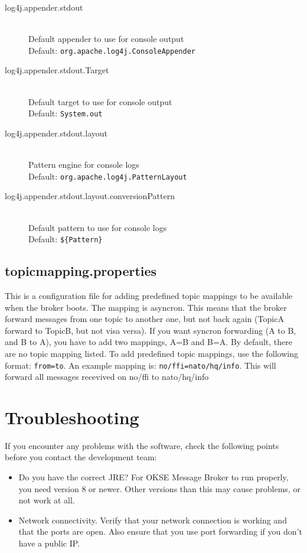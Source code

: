 \begin{description}
 \item[log4j.appender.stdout] \hfill \\
  Default appender to use for console output \hfill \\ Default: \verb!org.apache.log4j.ConsoleAppender!
   \item[log4j.appender.stdout.Target] \hfill \\
  Default target to use for console output \hfill \\ Default: \verb!System.out!
    \item[log4j.appender.stdout.layout] \hfill \\
  Pattern engine for console logs \hfill \\ Default: \verb!org.apache.log4j.PatternLayout!
   \item[log4j.appender.stdout.layout.conversionPattern] \hfill \\
  Default pattern to use for console logs \hfill \\ Default: \verb!${Pattern}!
  
 \end{description}
 
 \subsection{topicmapping.properties}
 \label{subsec:topicmapping.properties}
 
 This is a configuration file for adding predefined topic mappings to be available when the broker boots. The mapping is asyncron. This means that the broker forward messages from one topic to another one, but not back again (TopicA forward to TopicB, but not visa versa). If you want syncron forwarding (A to B, and B to A), you have to add two mappings, A=B and B=A. By default, there are no topic mapping listed. To add predefined topic mappings, use the following format: \verb!from=to!. An example mapping is: \verb!no/ffi=nato/hq/info!.
This will forward all messages recevived on no/ffi to nato/hq/info
 
\section{Troubleshooting}

If you encounter any problems with the software, check the following points before you contact the development team: 

\begin{itemize}
\setlength{\itemsep}{0cm}%
\item Do you have the correct JRE? For OKSE Message Broker to run properly, you need version 8 or newer. Other versions than this may cause problems, or not work at all.
\item Network connectivity. Verify that your network connection is working and that the ports are open. Also ensure that you use port forwarding if you don't have a public IP. 
\end{itemize}

\clearpage
